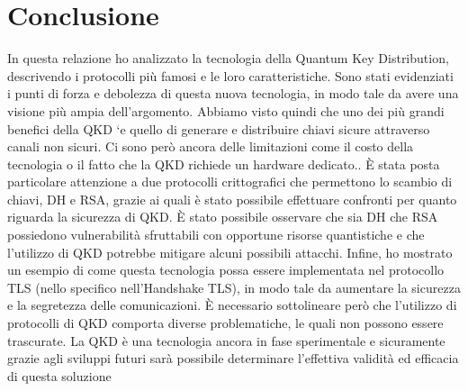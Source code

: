 \chapter*{Conclusione}
In questa relazione ho analizzato la tecnologia della Quantum Key Distribution, descrivendo i protocolli più famosi e le loro caratteristiche. Sono stati evidenziati i punti di forza e debolezza di questa nuova tecnologia, in modo tale da avere una visione più ampia dell'argomento. Abbiamo visto quindi che uno dei più grandi benefici della QKD `e quello di generare e distribuire chiavi sicure attraverso canali non sicuri. Ci sono però ancora delle limitazioni come il costo della tecnologia o il fatto che la QKD richiede un hardware dedicato.. È stata posta particolare attenzione a due protocolli crittografici che permettono lo scambio di chiavi, DH e RSA, grazie ai quali è stato possibile effettuare confronti per quanto riguarda la sicurezza di QKD. È stato possibile osservare che sia DH che RSA possiedono vulnerabilità sfruttabili con opportune risorse quantistiche e che l'utilizzo di QKD potrebbe mitigare alcuni possibili attacchi. Infine, ho mostrato un esempio di come questa tecnologia possa essere implementata nel protocollo TLS (nello specifico nell'Handshake TLS), in modo tale da aumentare la sicurezza e la segretezza delle comunicazioni. È necessario sottolineare però che l'utilizzo di protocolli di QKD comporta diverse problematiche, le quali non possono essere trascurate. La QKD è una tecnologia ancora in fase sperimentale e sicuramente grazie agli sviluppi futuri sarà possibile determinare l'effettiva validità ed efficacia di questa soluzione